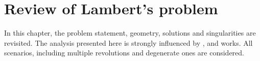 \chapter{Review of Lambert's problem}

In this chapter, the problem statement, geometry, solutions and singularities
are revisited. The analysis presented here is strongly influenced by
\cite{escobal1965}, \cite{el1968} and \cite{battin1999} works. All scenarios,
including multiple revolutions and degenerate ones are considered.






